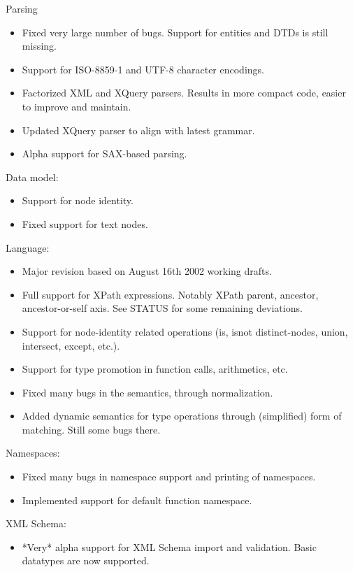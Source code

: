 Parsing
\begin{itemize}
\item Fixed very large number of bugs. Support for entities and DTDs is
  still missing.
\item Support for ISO-8859-1 and UTF-8 character encodings.
\item Factorized XML and XQuery parsers. Results in more compact code,
  easier to improve and maintain.
\item Updated XQuery parser to align with latest grammar.
\item Alpha support for SAX-based parsing.
\end{itemize}

Data model:
\begin{itemize}
\item Support for node identity.
\item Fixed support for text nodes.
\end{itemize}

Language:
\begin{itemize}
\item Major revision based on August 16th 2002 working drafts.
\item Full support for XPath expressions. Notably XPath parent, ancestor,
  ancestor-or-self axis. See STATUS for some remaining deviations.
\item Support for node-identity related operations (is, isnot
  distinct-nodes, union, intersect, except, etc.).
\item Support for type promotion in function calls, arithmetics, etc.
\item Fixed many bugs in the semantics, through normalization.
\item Added dynamic semantics for type operations through (simplified)
  form of matching. Still some bugs there.
\end{itemize}

Namespaces:
\begin{itemize}
\item Fixed many bugs in namespace support and printing of namespaces.
\item Implemented support for default function namespace.
\end{itemize}

XML Schema:
\begin{itemize}
\item *Very* alpha support for XML Schema import and validation. Basic
  datatypes are now supported.
\end{itemize}

